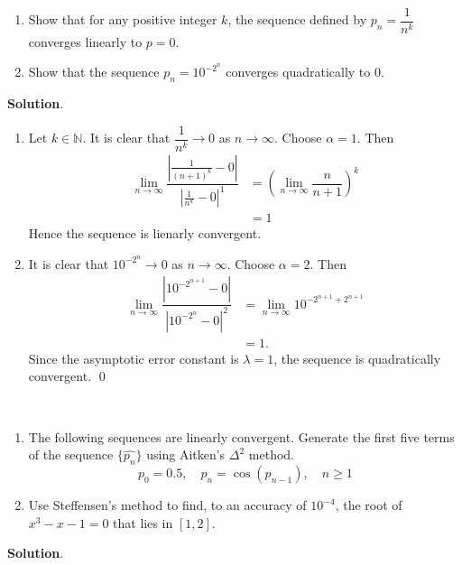 \documentclass[11pt]{article}
\theoremstyle{break}
\numberwithin{equation}{theorem}
\begin{document}
\newpage
\begin{problem}\label{problem 9}$\ $
    \begin{enumerate}
        \item Show that for any positive integer $k$, the sequence defined by $p_n=\dfrac{1}{n^k}$ converges linearly to $p=0$.
        \item Show that the sequence $p_n=10^{-2^n}$ converges quadratically to $0$.
    \end{enumerate}
\end{problem}
\textbf{Solution}.
\begin{enumerate}
    \item Let $k\in\mathbb{N}$. It is clear that $\dfrac{1}{n^k}\to0$ as $n\to\infty$. Choose $\alpha=1$. Then
    \begin{align*}
        \lim_{n\to\infty}\dfrac{\left\lvert\frac{1}{(n+1)^k}-0\right\rvert}{\left\lvert\frac{1}{n^k}-0\right\rvert^1}&=\left(\lim_{n\to\infty}\dfrac{n}{n+1}\right)^k\\
        &=1
    \end{align*}
    Hence the sequence is lienarly convergent.
    \item It is clear that $10^{-2^n}\to0$ as $n\to\infty$. Choose $\alpha=2$. Then
    \begin{align*}
        \lim_{n\to\infty}\dfrac{\left\lvert10^{-2^{n+1}}-0\right\rvert}{\left\lvert10^{-2^n}-0\right\rvert^2}&=\lim_{n\to\infty}10^{-2^{n+1}+2^{n+1}}\\
        &=1.
    \end{align*}
    Since the asymptotic error constant is $\lambda=1$, the sequence is quadratically convergent. \qed
\end{enumerate}


\newpage
\begin{problem}\label{problem 10}$\ $
    \begin{enumerate}
        \item The following sequences are linearly convergent. Generate the first five terms of the sequence $\{\hat{p_n}\}$ using Aitken's $\Delta^2$ method.
        \begin{equation*}
            p_0=0.5, \quad p_n=\cos(p_{n-1}), \quad n\geq 1
        \end{equation*}
        \item Use Steffensen's method to find, to an accuracy of $10^{-4}$, the root of $x^3-x-1=0$ that lies in $[1, 2]$.
    \end{enumerate}
\end{problem}
\textbf{Solution}.
\end{document}
